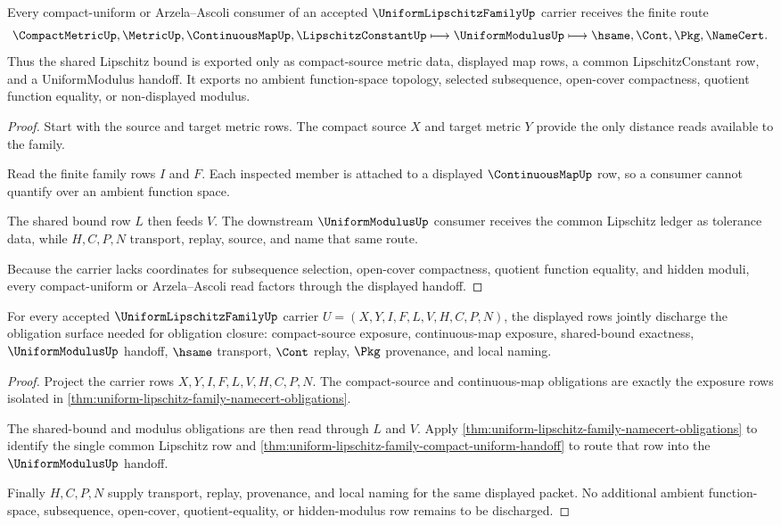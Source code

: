\begin{theorem}
\label{thm:uniform-lipschitz-family-compact-uniform-handoff}
Every compact-uniform or Arzela--Ascoli consumer of an accepted $\UniformLipschitzFamilyUp$ carrier receives the finite route
$$
\CompactMetricUp,\MetricUp,\ContinuousMapUp,\LipschitzConstantUp
\longmapsto
\UniformModulusUp
\longmapsto
\hsame,\Cont,\Pkg,\NameCert .
$$
Thus the shared Lipschitz bound is exported only as compact-source metric data, displayed map rows, a common LipschitzConstant row, and a UniformModulus handoff. It exports no ambient function-space topology, selected subsequence, open-cover compactness, quotient function equality, or non-displayed modulus.
\end{theorem}
\begin{proof}
Start with the source and target metric rows. The compact source $X$ and target metric $Y$ provide the only distance reads available to the family.

Read the finite family rows $I$ and $F$. Each inspected member is attached to a displayed $\ContinuousMapUp$ row, so a consumer cannot quantify over an ambient function space.

The shared bound row $L$ then feeds $V$. The downstream $\UniformModulusUp$ consumer receives the common Lipschitz ledger as tolerance data, while $H,C,P,N$ transport, replay, source, and name that same route.

Because the carrier lacks coordinates for subsequence selection, open-cover compactness, quotient function equality, and hidden moduli, every compact-uniform or Arzela--Ascoli read factors through the displayed handoff.
\end{proof}

\begin{theorem}
\label{thm:uniform-lipschitz-family-obligation-surface}
For every accepted $\UniformLipschitzFamilyUp$ carrier $U=(X,Y,I,F,L,V,H,C,P,N)$, the displayed rows jointly discharge the obligation surface needed for obligation closure: compact-source exposure, continuous-map exposure, shared-bound exactness, $\UniformModulusUp$ handoff, $\hsame$ transport, $\Cont$ replay, $\Pkg$ provenance, and local naming.
\end{theorem}
\begin{proof}
Project the carrier rows $X,Y,I,F,L,V,H,C,P,N$. The compact-source and continuous-map obligations are exactly the exposure rows isolated in \autoref{thm:uniform-lipschitz-family-namecert-obligations}.

The shared-bound and modulus obligations are then read through $L$ and $V$. Apply \autoref{thm:uniform-lipschitz-family-namecert-obligations} to identify the single common Lipschitz row and \autoref{thm:uniform-lipschitz-family-compact-uniform-handoff} to route that row into the $\UniformModulusUp$ handoff.

Finally $H,C,P,N$ supply transport, replay, provenance, and local naming for the same displayed packet. No additional ambient function-space, subsequence, open-cover, quotient-equality, or hidden-modulus row remains to be discharged.
\end{proof}

